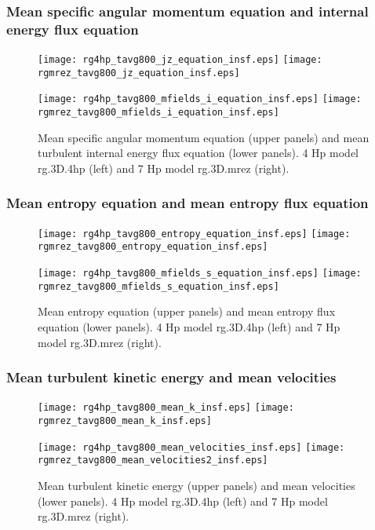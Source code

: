 \documentclass[10pt,paper=a4]{report}
\begin{document}
\newpage

\subsubsection{Mean specific angular momentum equation and internal energy flux equation}

\begin{figure}[!h]
\centerline{
\texttt{[image: rg4hp\_tavg800\_jz\_equation\_insf.eps]}
\texttt{[image: rgmrez\_tavg800\_jz\_equation\_insf.eps]}}

\centerline{
\texttt{[image: rg4hp\_tavg800\_mfields\_i\_equation\_insf.eps]}
\texttt{[image: rgmrez\_tavg800\_mfields\_i\_equation\_insf.eps]}}
\caption{Mean specific angular momentum equation (upper panels) and mean turbulent internal energy flux equation (lower panels). 4 Hp model {\sf rg.3D.4hp} (left) and 7 Hp model {\sf rg.3D.mrez} (right).}
\end{figure}

\newpage

\subsubsection{Mean entropy equation and mean entropy flux equation}

\begin{figure}[!h]
\centerline{
\texttt{[image: rg4hp\_tavg800\_entropy\_equation\_insf.eps]}
\texttt{[image: rgmrez\_tavg800\_entropy\_equation\_insf.eps]}}

\centerline{
\texttt{[image: rg4hp\_tavg800\_mfields\_s\_equation\_insf.eps]}
\texttt{[image: rgmrez\_tavg800\_mfields\_s\_equation\_insf.eps]}}
\caption{Mean entropy equation (upper panels) and mean entropy flux equation (lower panels). 4 Hp model {\sf rg.3D.4hp} (left) and 7 Hp model {\sf rg.3D.mrez} (right).}
\end{figure}

\newpage

\subsubsection{Mean turbulent kinetic energy and mean velocities}

\begin{figure}[!h]
\centerline{
\texttt{[image: rg4hp\_tavg800\_mean\_k\_insf.eps]}
\texttt{[image: rgmrez\_tavg800\_mean\_k\_insf.eps]}}

\centerline{
\texttt{[image: rg4hp\_tavg800\_mean\_velocities\_insf.eps]}
\texttt{[image: rgmrez\_tavg800\_mean\_velocities2\_insf.eps]}}
\caption{Mean turbulent kinetic energy (upper panels) and mean velocities (lower panels). 4 Hp model {\sf rg.3D.4hp} (left) and 7 Hp model {\sf rg.3D.mrez} (right).}
\end{figure}
\end{document}
